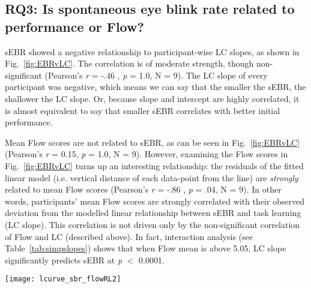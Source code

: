\subsection*{RQ3: Is spontaneous eye blink rate related to performance or Flow?}

sEBR showed a negative relationship to participant-wise LC slopes, as shown in Fig.~\ref{fig:EBRvLC}. The correlation is of moderate strength, though non-significant (Pearson's {\it r} = -.46 , {\it p} = 1.0, N = 9). %
The LC slope of every participant was negative, which means we can say that the smaller the sEBR, the shallower the LC slope. Or, because slope and intercept are highly correlated, it is almost equivalent to say that smaller sEBR correlates with better initial performance.

Mean Flow scores are not related to sEBR, as can be seen in Fig.~\ref{fig:EBRvLC} (Pearson's {\it r} = 0.15, {\it p} = 1.0, N = 9). %
However, examining the Flow scores in Fig.~\ref{fig:EBRvLC} turns up an interesting relationship: the residuals of the fitted linear model (i.e. vertical distance of each data-point from the line) are {\it strongly} related to mean Flow scores (Pearson's {\it r} = -.86 , {\it p} = .04, N = 9). %
In other words, participants' mean Flow scores are strongly correlated with their observed deviation from the modelled linear relationship between sEBR and task learning (LC slope). This correlation is not driven only by the non-significant correlation of Flow and LC (described above). In fact, interaction analysis (see Table~\ref{tab:simpslopes}) shows that when Flow mean is above 5.05, LC slope significantly predicts sEBR at {\it p} $<$ 0.0001.

\begin{figure*}[!ht]
	\centering
	\texttt{[image: lcurve\_sbr\_flowRL2]}
	\caption{Participants' median spontaneous eye blink rate plotted against the slope of their learning curve, and coloured by their mean Flow scores. Linear model is depicted by the dashed line. Each point is labelled with the participant number (1..9) and exact mean Flow score (in parentheses).}
	\label{fig:EBRvLC}
\end{figure*}


